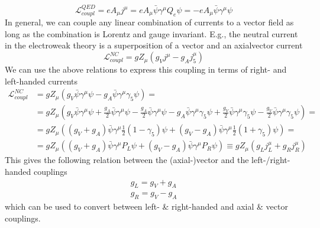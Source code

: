 \begin{equation*}
\mathcal{L}_{coupl}^{QED} = e A_ {\mu} j^{\mu} = e A_{\mu} \bar{\psi} \gamma^{\mu} Q_e \psi = -e A_{\mu} \bar{\psi} \gamma^{\mu} \psi 
\end{equation*}
In general, we can couple any linear combination of currents to a vector field as long as the combination is Lorentz and gauge invariant. E.g., the neutral current in the electroweak theory is a superposition of a vector and an axialvector current
\begin{equation*}
\mathcal{L}_{coupl}^{NC} = g Z_{\mu} \left( g_V j^{\mu} - g_A j^{\mu}_5 \right)
\end{equation*}
We can use the above relations to express this coupling in terms of right- and left-handed currents
\begin{align*}
\mathcal{L}_{coupl}^{NC} & = g Z_{\mu} \left( g_V \bar{\psi} \gamma^{\mu} \psi - g_A \bar{\psi} \gamma^{\mu} \gamma_5 \psi \right) = & \\
& = g Z_{\mu} \left( g_V \bar{\psi} \gamma^{\mu} \psi + \frac{g_A}{2} \bar{\psi} \gamma^{\mu} \psi - \frac{g_A}{2} \bar{\psi} \gamma^{\mu} \psi - g_A \bar{\psi} \gamma^{\mu} \gamma_5 \psi + \frac{g_V}{2} \bar{\psi} \gamma^{\mu} \gamma_5 \psi - \frac{g_V}{2} \bar{\psi} \gamma^{\mu} \gamma_5 \psi \right) = & \\
& = g Z_{\mu} \left( \left( g_V + g_A \right) \bar{\psi} \gamma^{\mu} \frac{1}{2} \left( 1 - \gamma_5 \right) \psi + \left( g_V - g_A \right) \bar{\psi} \gamma^{\mu} \frac{1}{2} \left( 1 + \gamma_5 \right) \psi \right) = & \\
& = g Z_{\mu} \left( \left( g_V + g_A \right) \bar{\psi} \gamma^{\mu} P_L \psi + \left( g_V - g_A \right) \bar{\psi} \gamma^{\mu} P_R \psi \right) \equiv g Z_{\mu} \left( g_L j^{\mu}_L + g_R j^{\mu}_R \right)  &
\end{align*}
This gives the following relation between the (axial-)vector and the left-/right-handed couplings
\begin{align}
&g_L = g_V + g_A &\\
&g_R = g_V - g_A &
\end{align}
which can be used to convert between left- \& right-handed and axial \& vector couplings.